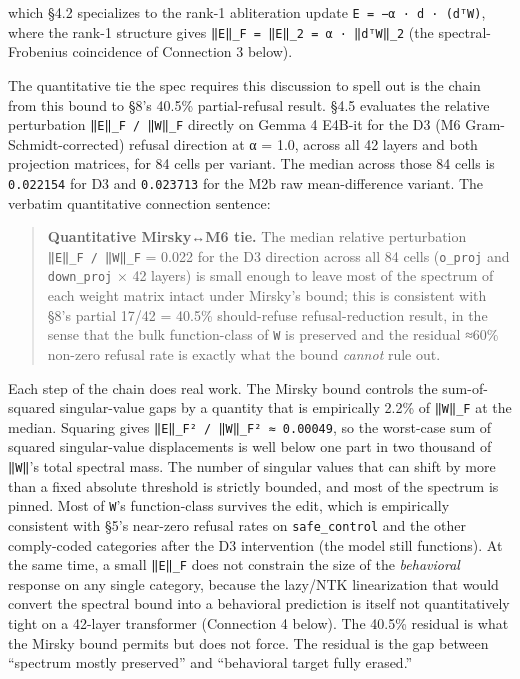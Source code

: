 \documentclass[
  11pt,
]{article}
\begin{document}
which §4.2 specializes to the rank-1 abliteration update
\texttt{E\ =\ −α\ ·\ d\ ·\ (dᵀW)}, where the rank-1 structure gives
\texttt{‖E‖\_F\ =\ ‖E‖\_2\ =\ \textbar{}α\textbar{}\ ·\ ‖dᵀW‖\_2} (the
spectral-Frobenius coincidence of Connection 3 below).

The quantitative tie the spec requires this discussion to spell out is
the chain from this bound to §8's 40.5\% partial-refusal result. §4.5
evaluates the relative perturbation \texttt{‖E‖\_F\ /\ ‖W‖\_F} directly
on Gemma 4 E4B-it for the D3 (M6 Gram-Schmidt-corrected) refusal
direction at α = 1.0, across all 42 layers and both projection matrices,
for 84 cells per variant. The median across those 84 cells is
\texttt{0.022154} for D3 and \texttt{0.023713} for the M2b raw
mean-difference variant. The verbatim quantitative connection sentence:

\begin{quote}
\textbf{Quantitative Mirsky↔M6 tie.} The median relative perturbation
\texttt{‖E‖\_F\ /\ ‖W‖\_F} = 0.022 for the D3 direction across all 84
cells (\texttt{o\_proj} and \texttt{down\_proj} × 42 layers) is small
enough to leave most of the spectrum of each weight matrix intact under
Mirsky's bound; this is consistent with §8's partial 17/42 = 40.5\%
should-refuse refusal-reduction result, in the sense that the bulk
function-class of \texttt{W} is preserved and the residual ≈60\%
non-zero refusal rate is exactly what the bound \emph{cannot} rule out.
\end{quote}

Each step of the chain does real work. The Mirsky bound controls the
sum-of-squared singular-value gaps by a quantity that is empirically
2.2\% of \texttt{‖W‖\_F} at the median. Squaring gives
\texttt{‖E‖\_F²\ /\ ‖W‖\_F²\ ≈\ 0.00049}, so the worst-case sum of
squared singular-value displacements is well below one part in two
thousand of \texttt{‖W‖}'s total spectral mass. The number of singular
values that can shift by more than a fixed absolute threshold is
strictly bounded, and most of the spectrum is pinned. Most of
\texttt{W}'s function-class survives the edit, which is empirically
consistent with §5's near-zero refusal rates on \texttt{safe\_control}
and the other comply-coded categories after the D3 intervention (the
model still functions). At the same time, a small \texttt{‖E‖\_F} does
not constrain the size of the \emph{behavioral} response on any single
category, because the lazy/NTK linearization that would convert the
spectral bound into a behavioral prediction is itself not quantitatively
tight on a 42-layer transformer (Connection 4 below). The 40.5\%
residual is what the Mirsky bound permits but does not force. The
residual is the gap between ``spectrum mostly preserved'' and
``behavioral target fully erased.''
\end{document}

